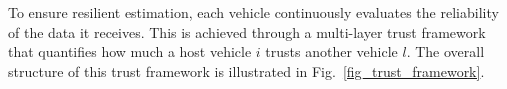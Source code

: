 To ensure resilient estimation, each vehicle continuously evaluates the reliability of the data it receives.
This is achieved through a multi-layer trust framework that quantifies how much a host vehicle $i$ trusts another vehicle $l$. The overall structure of this trust framework is illustrated in Fig.~\ref{fig_trust_framework}.
